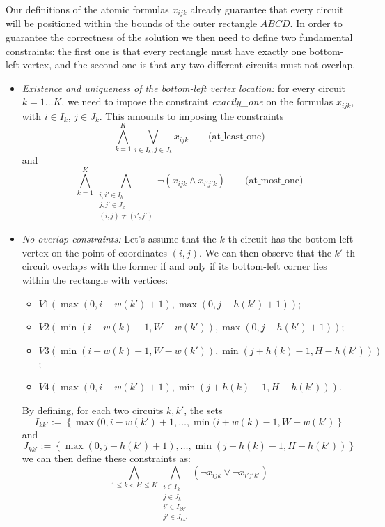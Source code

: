 \documentclass[]{article}
\begin{document}
Our definitions of the atomic formulas $x_{ijk}$ already guarantee that every circuit will be positioned within the bounds of the outer rectangle $ABCD$. In order to guarantee the correctness of the solution we then need to define two fundamental constraints: the first one is that every rectangle must have exactly one bottom-left vertex, and the second one is that any two different circuits must not overlap. 
\begin{itemize}
	\item \emph{Existence and uniqueness of the bottom-left vertex location:} for every circuit $k=1 \dots K$, we need to impose the constraint
	\emph{exactly\_one} on the formulas $x_{ijk}$, with $i\in I_k$, $j \in J_k$. This amounts to imposing the constraints $$\bigwedge_{k=1}^{K} \bigvee_{i\in I_k, j\in J_k} x_{ijk}\qquad \text{(at\_least\_one)}$$ and $$\bigwedge_{k=1}^{K} \bigwedge_{\substack{i,i'\in I_k \\ j,j'\in J_k \\ (i,j) \neq (i',j')}} \neg(x_{ijk}\wedge x_{i'j'k}) \qquad \text{(at\_most\_one)}$$
	\item \emph{No-overlap constraints:} Let's assume that the $k$-th circuit has the bottom-left vertex on the point of coordinates $(i,j)$. We can then observe that the $k'$-th circuit overlaps with the former if and only if its bottom-left corner lies within the rectangle with vertices:
	\begin{itemize}
		\item $V1(\max(0, i-w(k')+1), \max(0, j-h(k')+1))$;
		\item $V2(\min(i+w(k)-1, W-w(k')), \max (0, j-h(k')+1))$;
		\item $V3(\min(i+w(k)-1, W-w(k')), \min(j+h(k)-1, H-h(k')))$;
		\item $V4(\max(0, i-w(k')+1), \min(j+h(k)-1, H-h(k')))$.
	\end{itemize}
	By defining, for each two circuits $k, k'$, the sets $$I_{kk'}:=\left\{\max(0, i-w(k')+1, \dots, \min(i+w(k)-1, W-w(k')\right\}$$ and 
	$$J_{kk'}:=\left\{\max(0, j-h(k')+1), \dots, \min(j+h(k)-1, H-h(k'))\right\}$$
	we can then define these constraints as:
	$$\bigwedge_{1\leq k<k'\leq K} \bigwedge_{\substack{i \in I_k \\ j \in J_k \\ i'\in I_{kk'} \\ j' \in J_{kk'}}} \left(\neg x_{ijk} \lor \neg x_{i'j'k'}\right)$$
\end{itemize}
\end{document}
